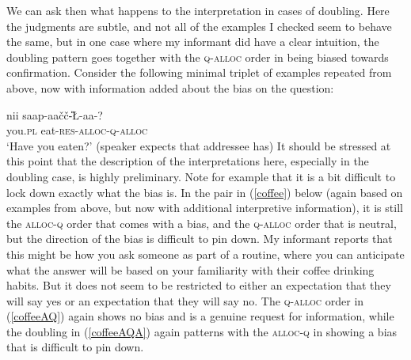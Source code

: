 \documentclass[output=paper, modfonts, nonflat]{langsci/langscibook}
\begin{document}
We can ask then what happens to the interpretation in cases of
doubling. Here the judgments are subtle, and not all of the examples I
checked seem to behave the same, but in one case where my informant
did have a clear intuition, the doubling pattern goes together with
the \textsc{q}-\textsc{alloc}{} order in being biased towards
confirmation. Consider the following minimal triplet of examples
repeated from above, now with information added about the bias on the
question: 

\ea
 \ex\label{youveeatenhaveyou}\gll nii\nga{}
 saap\textrtailt-aa\v{c}\v{c}\U-\nga\L-aa-\nga?\\ 
 you.\textsc{pl} eat-\textsc{res}-\textsc{alloc}-\textsc{q}-\textsc{alloc}\\
 \glt `Have you eaten?' (speaker expects that addressee has)
 \z
\z
%
It should be stressed at this point that the description of the
interpretations here, especially in the doubling case, is highly
preliminary. Note for example that it is a bit difficult to lock down
exactly what the bias is. In the pair in (\ref{coffee}) below (again
based on examples from above, but now with additional interpretive
information), it is still the \textsc{alloc}{}-\textsc{q} order that comes
with a bias, and the \textsc{q}-\textsc{alloc}{} order that is neutral, but
the direction of the bias is difficult to pin down. My informant
reports that this might be how you ask someone as part of a routine,
where you can anticipate what the answer will be based on your
familiarity with their coffee drinking habits. But it does not seem to
be restricted to either an expectation that they will say yes or an
expectation that they will say no. The \textsc{q}-\textsc{alloc}{} order in
(\ref{coffeeAQ}) again shows no bias and is a genuine request for
information, while the doubling in (\ref{coffeeAQA}) again patterns
with the \textsc{alloc}{}-\textsc{q} in showing a bias that is difficult to
pin down.
\end{document}
